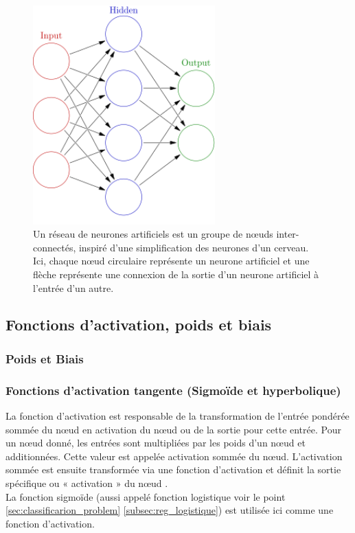 	
	
	\begin{figure}[hth]%
		\centering
		\includegraphics[width=7cm]{images/colored_neural_network.png}
		\caption{Un réseau de neurones artificiels est un groupe de nœuds inter-connectés, inspiré d'une simplification des neurones d'un cerveau. Ici, chaque nœud circulaire représente un neurone artificiel et une flèche représente une connexion de la sortie d'un neurone artificiel à l'entrée d'un autre.}
		\label{fig:colored_neural_network}
	\end{figure}
	
	\subsection{Fonctions d'activation, poids et biais} \label{sec:activation_weight}
	\subsubsection{Poids et Biais}
	\subsubsection{Fonctions d'activation tangente (Sigmoïde et  hyperbolique)}
	La fonction d'activation est responsable de la transformation de l'entrée pondérée sommée du nœud en activation du nœud ou de la sortie pour cette entrée.
	Pour un nœud donné, les entrées sont multipliées par les poids d'un nœud et additionnées. Cette valeur est appelée activation sommée du nœud. L'activation sommée est ensuite transformée via une fonction d'activation et définit la sortie spécifique ou « activation » du nœud \cite{ml2008python}.\\
	La fonction sigmoïde (aussi appelé fonction logistique voir le point \ref{sec:classificarion_problem} \ref{subsec:reg_logistique}) est utilisée ici comme une fonction d'activation.	
	
